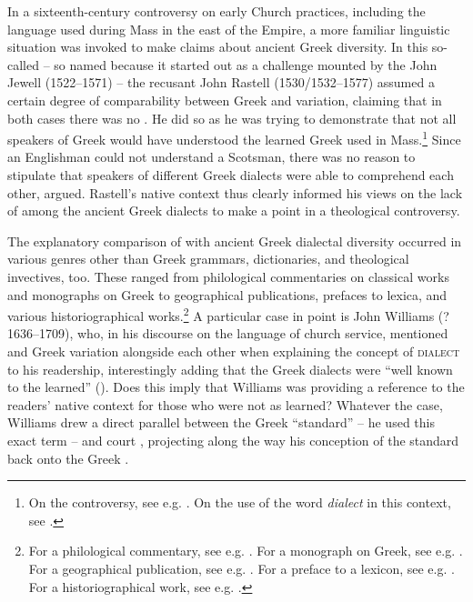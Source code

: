 In a sixteenth-century  controversy on early Church practices, including the language used during Mass in the east of the  Empire, a more familiar linguistic situation was invoked to make claims about ancient Greek diversity. In this so-called  – so named because it started out as a challenge mounted by the  John Jewell (1522–1571) – the  recusant John Rastell (1530/1532–1577) assumed a certain degree of comparability between Greek and  variation, claiming that in both cases there was no . He did so as he was trying to demonstrate that not all speakers of Greek would have understood the learned Greek used in Mass.\footnote{On the controversy, see e.g. \citet[115--154]{Jenkins2006}. On the use of the  word \textit{dialect} in this context, see \citet[647--651]{VanRooyConsidine2016}.} Since an Englishman could not understand a Scotsman, there was no reason to stipulate that speakers of different Greek dialects were able to comprehend each other, \citet[68\textsc{\textsuperscript{r}}]{Rastell1566} argued. Rastell’s native  context thus clearly informed his views on the lack of  among the ancient Greek dialects to make a point in a theological controversy.

The explanatory comparison of  with ancient Greek dialectal diversity occurred in various genres other than Greek grammars, dictionaries, and theological invectives, too. These ranged from philological commentaries on classical works and monographs on  Greek to geographical publications, prefaces to lexica, and various historiographical works.\footnote{For a philological commentary, see e.g. \citet[68; –Greek comparison]{Casaubon1587}. For a monograph on  Greek, see e.g. \citet[212--213; also –Greek]{Cottiere1646}. For a geographical publication, see e.g. \citet[60; –Greek comparison]{Speed1676}. For a preface to a lexicon, see e.g. \citet[(b.3)\textsuperscript{v}\textsc{;} also –Greek]{Phillips1658}. For a historiographical work, see e.g. \citet[108, 117; /–Greek comparison]{Freret1809}.} A particular case in point is John Williams (?1636–1709), who, in his discourse on the language of church service, mentioned  and Greek variation alongside each other when explaining the concept of \textsc{dialect} to his readership, interestingly adding that the Greek dialects were “well known to the learned” (\citeyear[5]{Williams1685}). Does this imply that Williams was providing a reference to the readers’ native context for those who were not as learned? Whatever the case, Williams drew a direct parallel between the Greek  “standard” – he used this exact term – and court , projecting along the way his conception of the  standard back onto the Greek .

